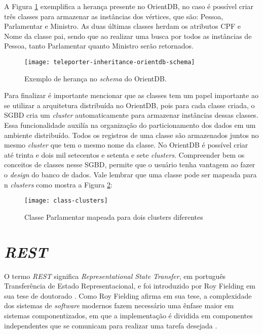 	A Figura \ref{fig:inheritance-orient}  exemplifica a herança presente no OrientDB, no caso é possível criar três classes para armazenar as instâncias dos vértices, que são: Pessoa, Parlamentar e Ministro. As duas últimas classes herdam os atributos CPF e Nome da classe pai, sendo que ao realizar uma busca por todos as instâncias de Pessoa, tanto Parlamentar quanto Ministro serão retornados.
	
\begin{figure}[h]
	\centering
    \texttt{[image: teleporter-inheritance-orientdb-schema]}
    \caption{Exemplo de herança no \textit{schema} do OrientDB.}
    \label{fig:inheritance-orient}
\end{figure}
	
	Para finalizar é importante mencionar que as classes tem um papel importante ao se utilizar a arquitetura distribuída no OrientDB, pois para cada classe criada, o SGBD cria um \textit{cluster} automaticamente para armazenar instâncias dessas classes. Essa funcionalidade auxilía na organização do particionamento dos dados em um ambiente distribuído. Todos os registros de uma classe são armazenados juntos no mesmo \textit{cluster} que tem o mesmo nome da classe. No OrientDB é possível criar até trinta e dois mil setecentos e setenta e sete \textit{clusters}. Compreender bem os conceitos de classes nesse SGBD, permite que o usuário tenha vantagem ao fazer o \textit{design} do banco de dados. Vale lembrar que uma classe pode ser mapeada para n \textit{clusters} como mostra a Figura \ref{fig:class-cluster}:
\begin{figure}[H]
	\centering
    \texttt{[image: class-clusters]}
    \caption{Classe Parlamentar mapeada para dois clusters diferentes}
    \label{fig:class-cluster}
\end{figure}

\section{\textit{REST}}

	O termo \textit{REST} significa \textit{Representational State Transfer}, em português Transferência de Estado Representacional, e foi introduzido por Roy Fielding em sua tese de doutorado \cite{fielding2000architectural}. Como Roy Fielding afirma em sua tese, a complexidade dos sistemas de \textit{software} modernos fazem necessário uma ênfase maior  em sistemas componentizados, em que a implementação é dividida em componentes independentes que se comunicam para realizar uma tarefa desejada \cite{fielding2000architectural}.
	
